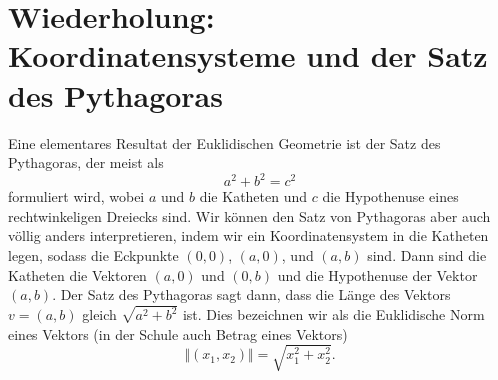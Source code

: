 \documentclass[letterpaper,10pt,english]{jupyterBook}
\begin{document}
\section{Wiederholung: Koordinatensysteme und der Satz des Pythagoras}
\label{\detokenize{vorkurs/koord:wiederholung-koordinatensysteme-und-der-satz-des-pythagoras}}\label{\detokenize{vorkurs/koord::doc}}
Eine elementares Resultat der Euklidischen Geometrie ist der Satz des Pythagoras, der meist als
\begin{equation*}
 a^2 + b^2 = c^2\end{equation*}
formuliert wird, wobei \(a\) und \(b\) die Katheten und \(c\) die Hypothenuse eines rechtwinkeligen Dreiecks sind.
Wir können den Satz von Pythagoras aber auch völlig anders interpretieren, indem wir ein Koordinatensystem in die Katheten legen, sodass die Eckpunkte \((0,0)\), \((a,0)\), und \((a,b)\) sind. Dann sind die Katheten die Vektoren \((a,0)\) und \((0,b)\) und die Hypothenuse der Vektor \((a,b)\). Der Satz des Pythagoras sagt dann, dass die Länge des Vektors \(v=(a,b)\) gleich \(\sqrt{a^2+b^2}\) ist. Dies bezeichnen wir als die Euklidische Norm eines Vektors (in der Schule auch Betrag eines Vektors)
\begin{equation*}
 \Vert (x_1,x_2) \Vert = \sqrt{x_1^2+x_2^2}.\end{equation*}
\end{document}
